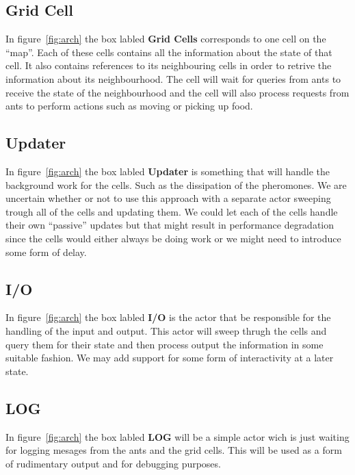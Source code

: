 \documentclass[a4paper]{article}
\begin{document}
\subsection{Grid Cell}
In figure~\ref{fig:arch} the box labled \textbf{Grid Cells} corresponds to one
cell on the ``map''. Each of these cells contains all the information about the state of
that cell. It also contains references to its neighbouring cells in order to
retrive the information about its neighbourhood. The cell will wait for queries
from ants to receive the state of the neighbourhood and the cell will also
process requests from ants to perform actions such as moving or picking up food.

\subsection{Updater}
In figure~\ref{fig:arch} the box labled \textbf{Updater} is something that will
handle the background work for the cells. Such as the dissipation of the pheromones.
We are uncertain whether or not to use this approach with a separate actor sweeping
trough all of the cells and updating them. We could let each of the cells handle
their own ``passive'' updates but that might result in performance degradation
since the cells would either always be doing work or we might need to introduce
some form of delay.

\subsection{I/O}
In figure~\ref{fig:arch} the box labled \textbf{I/O} is the actor that be
responsible for the handling of the input and output. This actor will sweep thrugh the cells and
query them for their state and then process output the information in some
suitable fashion. We may add support for some form of interactivity at a later
state.

\subsection{LOG}
In figure~\ref{fig:arch} the box labled \textbf{LOG} will be a simple actor wich
is just waiting for logging mesages from the ants and the grid cells. This will be
used as a form of rudimentary output and for debugging purposes.
\end{document}

